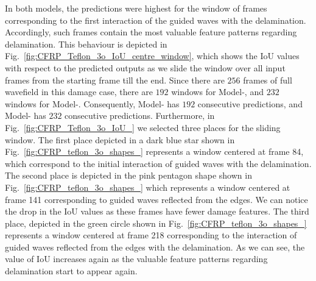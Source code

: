 \begin{sloppypar}
	In both models, the predictions were highest for the window of frames corresponding to the first interaction of the guided waves with the delamination.
	Accordingly, such frames contain the most valuable feature patterns regarding delamination. 
	This behaviour is depicted in Fig.~\ref{fig:CFRP_Teflon_3o_IoU_centre_window}, which shows the IoU values with respect to the predicted outputs as we slide the window over all input frames from the starting frame till the end.
	Since there are \(256\) frames of full wavefield in this damage case, there are \(192\) windows for Model-, and \(232\) windows for Model-.
	Consequently, Model- has \(192\) consecutive predictions, and Model- has \(232\) consecutive predictions.
	Furthermore, in Fig.~\ref{fig:CFRP_Teflon_3o_IoU_} we selected three places for the sliding window. 
	The first place depicted in a dark blue star shown in Fig.~\ref{fig:CFRP_teflon_3o_shapes_} represents a window centered at frame 84, which correspond to the initial interaction of guided waves with the delamination.
	The second place is depicted in the pink pentagon shape shown in Fig.~\ref{fig:CFRP_teflon_3o_shapes_} which represents a window centered at frame 141 corresponding to guided waves reflected from the edges.
	We can notice the drop in the IoU values as these frames have fewer damage features.
	The third place, depicted in the green circle shown in Fig.~\ref{fig:CFRP_teflon_3o_shapes_} represents a window centered at frame 218 corresponding to the interaction of guided waves reflected from the edges with the delamination.
	As we can see, the value of IoU increases again as the valuable feature patterns regarding delamination start to appear again.
	

\end{sloppypar}
